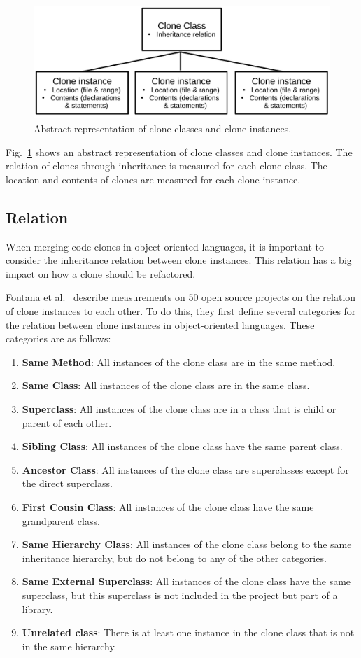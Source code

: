 \begin{figure}[H]
  \centering
    \includegraphics[width=0.8\columnwidth]{img/context}
    \caption{Abstract representation of clone classes and clone instances.}
  \label{fig:clonecontext}
\end{figure}

Fig.~\ref{fig:clonecontext} shows an abstract representation of clone classes and clone instances. The relation of clones through inheritance is measured for each clone class. The location and contents of clones are measured for each clone instance.

\subsection{Relation}\label{sec:setuprelation}
When merging code clones in object-oriented languages, it is important to consider the inheritance relation between clone instances. This relation has a big impact on how a clone should be refactored.

Fontana et al.~\cite{fontana2015duplicated} describe measurements on 50 open source projects on the relation of clone instances to each other. To do this, they first define several categories for the relation between clone instances in object-oriented languages. These categories are as follows:
\begin{enumerate}
  \item \textbf{Same Method}: All instances of the clone class are in the same method.
  \item \textbf{Same Class}: All instances of the clone class are in the same class.
  \item \textbf{Superclass}: All instances of the clone class are in a class that is child or parent of each other.
  \item \textbf{Sibling Class}: All instances of the clone class have the same parent class.
    \item \textbf{Ancestor Class}: All instances of the clone class are superclasses except for the direct superclass.
  \item \textbf{First Cousin Class}: All instances of the clone class have the same grandparent class.
\item \textbf{Same Hierarchy Class}: All instances of the clone class belong to the same inheritance hierarchy, but do not belong to any of the other categories.
\item \textbf{Same External Superclass}: All instances of the clone class have the same superclass, but this superclass is not included in the project but part of a library.
\item \textbf{Unrelated class}: There is at least one instance in the clone class that is not in the same hierarchy.
\end{enumerate}

